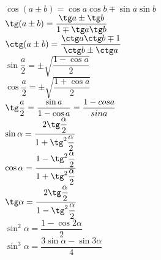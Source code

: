 $\cos(a \pm b) = \cos a \cos b \mp \sin a \sin b$\\
$\tg(a\pm b) = \dfrac{\tg a \pm \tg b}{1 \mp \tg a \tg b}$\\
$\ctg(a \pm b) = \dfrac{\ctg a \ctg b \mp 1}{\ctg b \pm \ctg a}$\\
$\sin \dfrac{a}{2} = \pm \sqrt{\dfrac{1-\cos a}{2}}$\\
$\cos \dfrac{a}{2} = \pm \sqrt{\dfrac{1+\cos a}{2}}$\\
$\tg \dfrac{a}{2} = \dfrac{\sin a}{1 - \cos a} = \dfrac{1 - cos a}{sin a}$\\
$\sin \alpha = \dfrac{2\tg \dfrac{\alpha}{2}}{1 + \tg^2\dfrac{\alpha}{2}}$\\
$\cos \alpha = \dfrac{1 - \tg^2\dfrac{\alpha}{2}}{1 +\tg^2\dfrac{\alpha}{2}}$\\
$\tg \alpha = \dfrac{2\tg \dfrac{\alpha}{2}}{1 - \tg^2\dfrac{\alpha}{2}}$\\
$\sin^2 \alpha  = \dfrac{1-\cos 2\alpha}{2}$\\
$\sin^3 \alpha  = \dfrac{3\sin\alpha -\sin 3\alpha }{4}$\\

